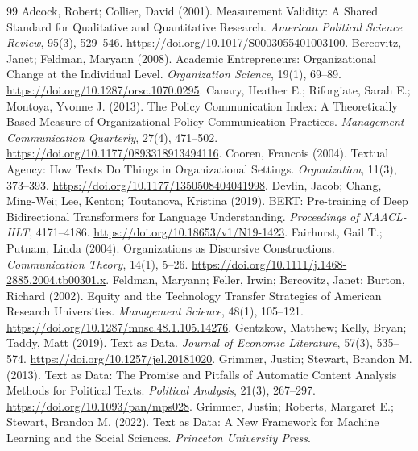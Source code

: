 \begin{thebibliography}{99}
\setlength{\itemsep}{1pt}
 Adcock, Robert; Collier, David (2001). Measurement Validity: A Shared Standard for Qualitative and Quantitative Research. \emph{American Political Science Review}, 95(3), 529--546. \url{https://doi.org/10.1017/S0003055401003100}.
 Bercovitz, Janet; Feldman, Maryann (2008). Academic Entrepreneurs: Organizational Change at the Individual Level. \emph{Organization Science}, 19(1), 69--89. \url{https://doi.org/10.1287/orsc.1070.0295}.
 Canary, Heather E.; Riforgiate, Sarah E.; Montoya, Yvonne J. (2013). The Policy Communication Index: A Theoretically Based Measure of Organizational Policy Communication Practices. \emph{Management Communication Quarterly}, 27(4), 471--502. \url{https://doi.org/10.1177/0893318913494116}.
 Cooren, Francois (2004). Textual Agency: How Texts Do Things in Organizational Settings. \emph{Organization}, 11(3), 373--393. \url{https://doi.org/10.1177/1350508404041998}.
 Devlin, Jacob; Chang, Ming-Wei; Lee, Kenton; Toutanova, Kristina (2019). BERT: Pre-training of Deep Bidirectional Transformers for Language Understanding. \emph{Proceedings of NAACL-HLT}, 4171--4186. \url{https://doi.org/10.18653/v1/N19-1423}.
 Fairhurst, Gail T.; Putnam, Linda (2004). Organizations as Discursive Constructions. \emph{Communication Theory}, 14(1), 5--26. \url{https://doi.org/10.1111/j.1468-2885.2004.tb00301.x}.
 Feldman, Maryann; Feller, Irwin; Bercovitz, Janet; Burton, Richard (2002). Equity and the Technology Transfer Strategies of American Research Universities. \emph{Management Science}, 48(1), 105--121. \url{https://doi.org/10.1287/mnsc.48.1.105.14276}.
 Gentzkow, Matthew; Kelly, Bryan; Taddy, Matt (2019). Text as Data. \emph{Journal of Economic Literature}, 57(3), 535--574. \url{https://doi.org/10.1257/jel.20181020}.
 Grimmer, Justin; Stewart, Brandon M. (2013). Text as Data: The Promise and Pitfalls of Automatic Content Analysis Methods for Political Texts. \emph{Political Analysis}, 21(3), 267--297. \url{https://doi.org/10.1093/pan/mps028}.
 Grimmer, Justin; Roberts, Margaret E.; Stewart, Brandon M. (2022). Text as Data: A New Framework for Machine Learning and the Social Sciences. \emph{Princeton University Press}.

\end{thebibliography}

